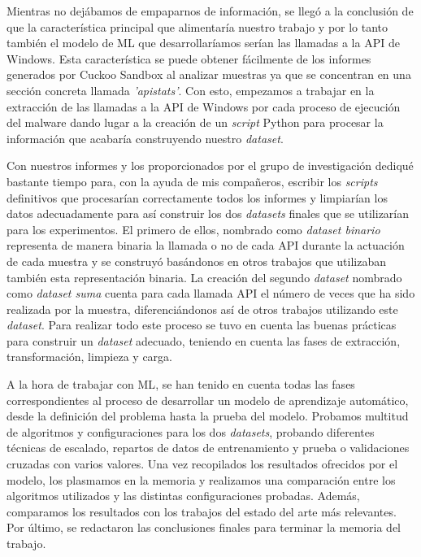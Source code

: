 Mientras no dejábamos de empaparnos de información, se llegó a la conclusión de que la característica principal que alimentaría nuestro trabajo y por lo tanto también el modelo de \gls{ML} que desarrollaríamos serían las llamadas a la \gls{API} de Windows. Esta característica se puede obtener fácilmente de los informes generados por Cuckoo Sandbox al analizar muestras ya que se concentran en una sección concreta llamada \textit{'apistats'}. Con esto, empezamos a trabajar en la extracción de las llamadas a la \gls{API} de Windows por cada proceso de ejecución del malware dando lugar a la creación de un \textit{script} Python para procesar la información que acabaría construyendo nuestro \textit{dataset}. 

Con nuestros informes y los proporcionados por el grupo de investigación dediqué bastante tiempo para, con la ayuda de mis compañeros, escribir los \textit{scripts} definitivos que procesarían correctamente todos los informes y limpiarían los datos adecuadamente para así construir los dos \textit{datasets} finales que se utilizarían para los experimentos. El primero de ellos, nombrado como \textit{dataset binario} representa de manera binaria la llamada o no de cada \gls{API} durante la actuación de cada muestra y se construyó basándonos en otros trabajos que utilizaban también esta representación binaria. La creación del segundo \textit{dataset} nombrado como \textit{dataset suma} cuenta para cada llamada \gls{API} el número de veces que ha sido realizada por la muestra, diferenciándonos así de otros trabajos utilizando este \textit{dataset}. Para realizar todo este proceso se tuvo en cuenta las buenas prácticas para construir un \textit{dataset} adecuado, teniendo en cuenta las fases de extracción, transformación, limpieza y carga.

A la hora de trabajar con \gls{ML}, se han tenido en cuenta todas las fases correspondientes al proceso de desarrollar un modelo de aprendizaje automático, desde la definición del problema hasta la prueba del modelo. Probamos multitud de algoritmos y configuraciones para los dos \textit{datasets}, probando diferentes técnicas de escalado, repartos de datos de entrenamiento y prueba o validaciones cruzadas con varios valores. Una vez recopilados los resultados ofrecidos por el modelo, los plasmamos en la memoria y realizamos una comparación entre los algoritmos utilizados y las distintas configuraciones probadas. Además, comparamos los resultados con los trabajos del estado del arte más relevantes. Por último, se redactaron las conclusiones finales para terminar la memoria del trabajo.

